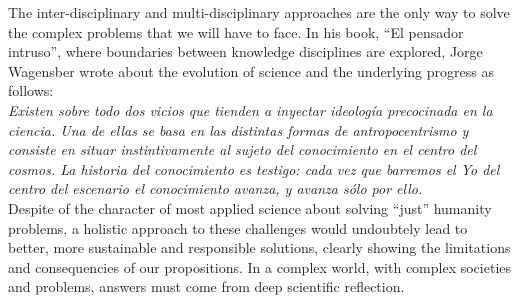 The inter-disciplinary and multi-disciplinary approaches are the only way to solve the complex problems that we will have to face. In his book, ``El pensador intruso'', where boundaries between knowledge disciplines are explored, Jorge Wagensber wrote about the evolution of science and the underlying progress as follows:\\ 

\textit{Existen sobre todo dos vicios que tienden a inyectar ideología precocinada en la ciencia. Una de ellas se basa en las distintas formas de antropocentrismo y consiste en situar instintivamente al sujeto del conocimiento en el centro del cosmos. La historia del conocimiento es testigo: cada vez que barremos el Yo del centro del escenario el conocimiento avanza, y avanza sólo por ello.}\\

Despite of the character of most applied science about solving ``just'' humanity problems, a holistic approach to these challenges would undoubtely lead to better, more sustainable and responsible solutions, clearly showing the limitations and consequencies of our propositions. In a complex world, with complex societies and problems, answers must come from deep scientific reflection.



